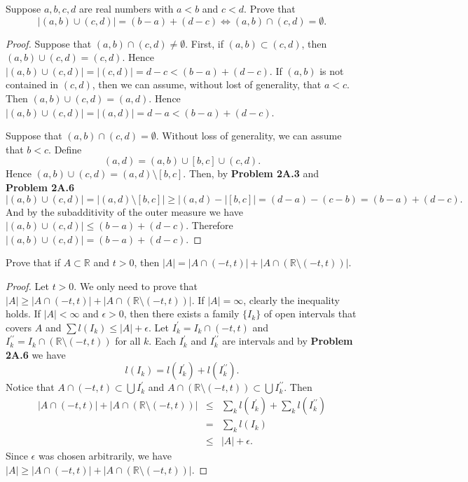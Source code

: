 \documentclass[14.5pt]{article}
\newcommand{\R}{\mathbb{R}}
\newenvironment{problem}[2][Problem]{\begin{mdframed}[backgroundcolor=gray!10, leftline = false, rightline=false, linewidth=0.25pt]  \begin{trivlist}
\item[\hskip \labelsep {\bfseries #1}\hskip \labelsep {\bfseries #2.}]}{\end{trivlist} \end{mdframed}  }
\begin{document}
\begin{problem}{2A.7} Suppose $a,b,c,d$ are real numbers with $a < b $ and $c < d.$ Prove that
$$|(a,b) \cup (c, d)| = (b-a) + (d-c) \iff (a, b) \cap (c,d) = \emptyset.$$
\end{problem}
\begin{proof}
    Suppose that $ (a, b) \cap (c,d) \neq \emptyset.$ First, if $(a,b) \subset (c,d)$, then $(a,b) \cup (c,d) = (c,d)$. Hence $|(a,b) \cup (c, d)| = |(c, d)| = d-c < (b-a) + (d-c).$ If $(a,b)$ is not contained in $(c,d)$, then we can assume, without lost of generality, that $a < c.$ Then $(a,b) \cup (c, d) = (a,d)$. Hence $|(a,b) \cup (c, d)| = | (a,d) | = d - a < (b-a) + (d - c)$.
    
    Suppose that $ (a, b) \cap (c,d) = \emptyset.$ Without loss of generality, we can assume that $b < c$. Define 
    $$(a, d) = (a, b) \cup [b,c] \cup (c, d).$$
    Hence $(a,b) \cup (c,d) = (a,d) \setminus [b,c]$. Then, by \textbf{Problem 2A.3} and \textbf{Problem 2A.6}
    $$|(a,b) \cup (c,d) | = |(a,d) \setminus [b,c]| \geq |(a,d) - |[b,c]| = (d-a) - (c-b) = (b-a) + (d-c).$$
    And by the subadditivity of the outer measure we have $|(a,b) \cup (c,d) |  \leq (b-a) + (d-c)$. Therefore $|(a,b) \cup (c,d) | = (b-a) + (d-c)$.
    
\end{proof}
\begin{problem}{2A.8} Prove that if $A \subset \R $ and $t > 0$, then $|A| = |A\cap (-t,t) | + | A \cap (\R \setminus (-t,t))|.$
\end{problem}
\begin{proof}
    Let $t > 0$. We only need to prove that $|A| \geq |A\cap (-t,t) | + | A \cap (\R \setminus (-t,t))|.$ If $|A| = \infty$, clearly the inequality holds. If $|A| < \infty$ and $\epsilon > 0$, then there exists a family $\{I_k\}$ of open intervals that covers $A$ and $\sum l(I_k) \leq |A| + \epsilon.$ Let $I_k^\prime = I_k \cap (-t,t)$ and $I_k^{\prime \prime} =  I_k \cap (\R \setminus(-t,t))$ for all $k$. Each $I_k^\prime$ and $I_k^{\prime \prime}$ are intervals and by \textbf{Problem 2A.6} we have
    $$l(I_k) = l(I_k^\prime) + l(I_k^{\prime \prime}).$$
    Notice that $A \cap (-t,t) \subset \bigcup I_k^\prime$ and $A \cap (\R \setminus (-t,t)) \subset \bigcup I_k^{\prime \prime}$. Then
    \begin{eqnarray*}
        |A\cap (-t,t) | + | A \cap (\R \setminus (-t,t))| &\leq& \sum_k l(I_k^\prime) + \sum_k l(I_k^{\prime \prime })\\
        &=& \sum_k l(I_k)\\
        &\leq& | A | + \epsilon.
    \end{eqnarray*}
    Since $\epsilon$ was chosen arbitrarily, we have $|A| \geq |A\cap (-t,t) | + | A \cap (\R \setminus (-t,t))|.$ 
\end{proof}
\end{document}

